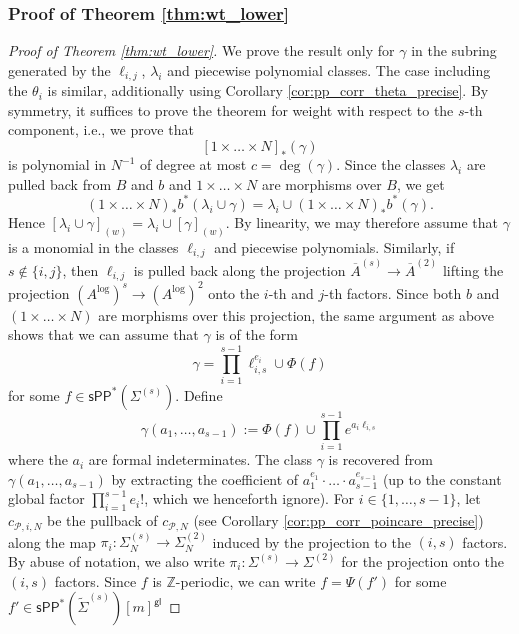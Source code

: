 \documentclass[11pt]{article}
\renewcommand{\log}{\mathrm{log}}
\newcommand{\barA}{\overline{A}}
\newcommand{\logA}{{A^{\log}}}
\newcommand{\sPP}{\mathsf{sPP}}
\newcommand{\spp}{\sPP}
\theoremstyle{definition}
\begin{document}
\subsubsection{Proof of Theorem \ref{thm:wt_lower}}
\label{sec:prf_wt_lower}

\begin{proof}[Proof of Theorem \ref{thm:wt_lower}]
	We prove the result only for $\gamma$ in the subring generated by the $\ell_{i,j}$, $\lambda_i$ and piecewise polynomial classes.
	The case including the $\theta_i$ is similar, additionally using Corollary \ref{cor:pp_corr_theta_precise}.
	By symmetry, it suffices to prove the theorem for weight with
	respect to the $s$-th component, i.e., we prove that
	$$[1\times\dots\times N]_{\ast}(\gamma)$$
	is polynomial in $N^{-1}$ of degree at most $c=\deg(\gamma)$. Since
	the classes $\lambda_i$ are pulled back from $B$ and
	$b$ and $1\times\dots\times N$ are morphisms over $B$, we get
	$$(1\times\dots\times N)_{\ast}b^{\ast}(\lambda_i\cup\gamma)=\lambda_i\cup(1\times\dots\times N)_{\ast}b^{\ast}(\gamma).$$
	Hence $[\lambda_i\cup\gamma]_{(w)}=\lambda_i\cup[\gamma]_{(w)}$. By linearity,
	we may therefore assume that $\gamma$ is a monomial in the classes
	$\ell_{i,j}$ and piecewise polynomials. Similarly, if $s\notin\{i,j\}$,
	then $\ell_{i,j}$ is pulled back along the projection
	$\barA^{(s)}\to \barA^{(2)}$ lifting the projection
	$(\logA)^{s}\to (\logA)^{2}$ onto the $i$-th and $j$-th factors. Since
	both $b$ and $(1\times\dots\times N)$ are morphisms over this
	projection, the same argument as above shows that we can assume
	that $\gamma$ is of the form
	$$\gamma=\prod_{i=1}^{s-1}\ell_{i,s}^{e_i}\cup\Phi(f)$$
	for some $f\in \spp^{\ast}(\Sigma^{(s)})$. Define
	$$\gamma(a_1,\dots,a_{s-1}):=\Phi(f)\cup\prod_{i=1}^{s-1}e^{a_i\ell_{i,s}}$$
	where the $a_i$ are formal indeterminates. The class $\gamma$ is recovered
	from $\gamma(a_1,\dots,a_{s-1})$ by extracting the coefficient of $a_1^{e_1}\cdot\dots\cdot a_{s-1}^{e_{s-1}}$ (up to the constant global factor $\prod_{i=1}^{s-1}e_i!$, which we henceforth ignore).
	For $i\in \{1,\dots,s-1\}$, let $c_{\mathcal P,i,N}$ be the pullback
	of $c_{\mathcal P,N}$ (see Corollary \ref{cor:pp_corr_poincare_precise})
	along the map $\pi_i:\Sigma_N^{(s)}\to \Sigma_N^{(2)}$ induced by
	the projection to the $(i,s)$ factors. By abuse of notation, we also
	write $\pi_i:\Sigma^{(s)}\to \Sigma^{(2)}$ for the projection onto
	the $(i,s)$ factors.
	Since $f$ is $\mathbb{Z}$-periodic, we can write
	$f=\Psi(f')$ for some $f'\in \spp^{\ast}(\tilde{\Sigma}^{(s)})[m]^{\mathsf{gl}}$

\end{proof}
\end{document}
